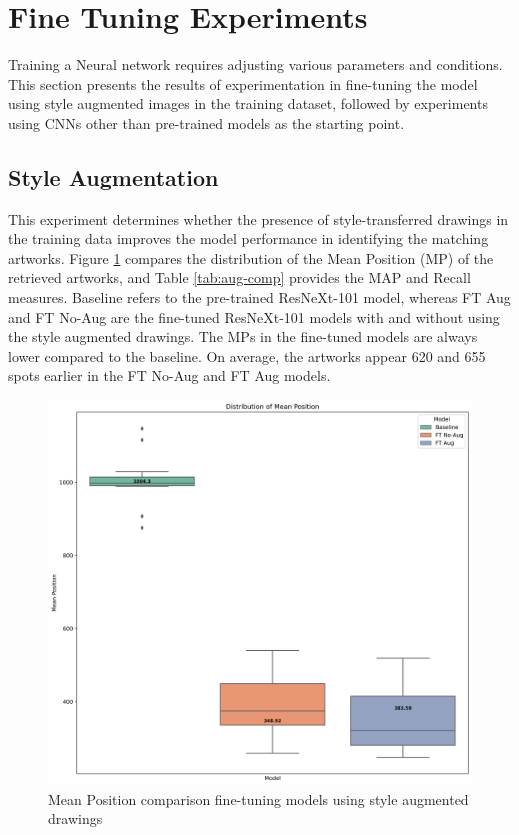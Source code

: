 \section{Fine Tuning Experiments}

Training a Neural network requires adjusting various parameters and conditions. This section presents the results of experimentation in fine-tuning the model using style augmented images in the training dataset, followed by experiments using CNNs other than pre-trained models as the starting point.

\subsection{Style Augmentation}\label{chap:5:sec:stle-aug}

This experiment determines whether the presence of style-transferred drawings in the training data improves the model performance in identifying the matching artworks. Figure \ref{fig:baseline-ft-map} compares the distribution of the Mean Position (MP) of the retrieved artworks, and Table \ref{tab:aug-comp} provides the MAP and Recall measures. Baseline refers to the pre-trained ResNeXt-101 model, whereas FT Aug and FT No-Aug are the fine-tuned ResNeXt-101 models with and without using the style augmented drawings. The MPs in the fine-tuned models are always lower compared to the baseline. On average, the artworks appear 620 and 655 spots earlier in the FT No-Aug and FT Aug models.

\begin{figure}[ht]
\centering
\includegraphics[width=\textwidth]{images/metrics/mp_baseline_500dpi.png}
  \caption{Mean Position comparison fine-tuning models using style augmented drawings}
  \label{fig:baseline-ft-map}
\end{figure}

